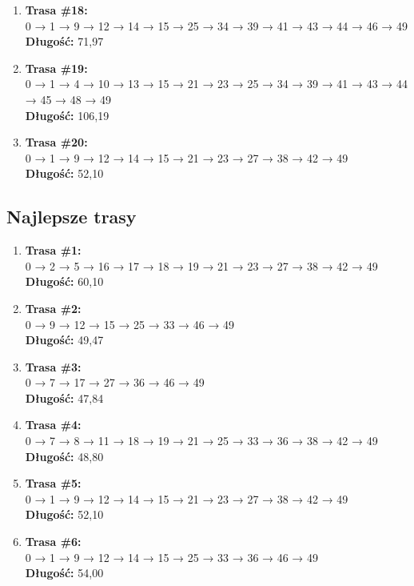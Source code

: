 \documentclass{article}
\begin{document}
\begin{enumerate}
    \item \textbf{Trasa \#18:}\\
    0 → 1 → 9 → 12 → 14 → 15 → 25 → 34 → 39 → 41 → 43 → 44 → 46 → 49\\
    \textbf{Długość:} 71{,}97

    \item \textbf{Trasa \#19:}\\
    0 → 1 → 4 → 10 → 13 → 15 → 21 → 23 → 25 → 34 → 39 → 41 → 43 → 44 → 45 → 48 → 49\\
    \textbf{Długość:} 106{,}19

    \item \textbf{Trasa \#20:}\\
    0 → 1 → 9 → 12 → 14 → 15 → 21 → 23 → 27 → 38 → 42 → 49\\
    \textbf{Długość:} 52{,}10
\end{enumerate}


\subsection*{Najlepsze trasy}

\begin{enumerate}
    \item \textbf{Trasa \#1:}\\
    0 → 2 → 5 → 16 → 17 → 18 → 19 → 21 → 23 → 27 → 38 → 42 → 49\\
    \textbf{Długość:} 60{,}10

    \item \textbf{Trasa \#2:}\\
    0 → 9 → 12 → 15 → 25 → 33 → 46 → 49\\
    \textbf{Długość:} 49{,}47

    \item \textbf{Trasa \#3:}\\
    0 → 7 → 17 → 27 → 36 → 46 → 49\\
    \textbf{Długość:} 47{,}84

    \item \textbf{Trasa \#4:}\\
    0 → 7 → 8 → 11 → 18 → 19 → 21 → 25 → 33 → 36 → 38 → 42 → 49\\
    \textbf{Długość:} 48{,}80

    \item \textbf{Trasa \#5:}\\
    0 → 1 → 9 → 12 → 14 → 15 → 21 → 23 → 27 → 38 → 42 → 49\\
    \textbf{Długość:} 52{,}10

    \item \textbf{Trasa \#6:}\\
    0 → 1 → 9 → 12 → 14 → 15 → 25 → 33 → 36 → 46 → 49\\
    \textbf{Długość:} 54{,}00
\end{enumerate}
\end{document}
